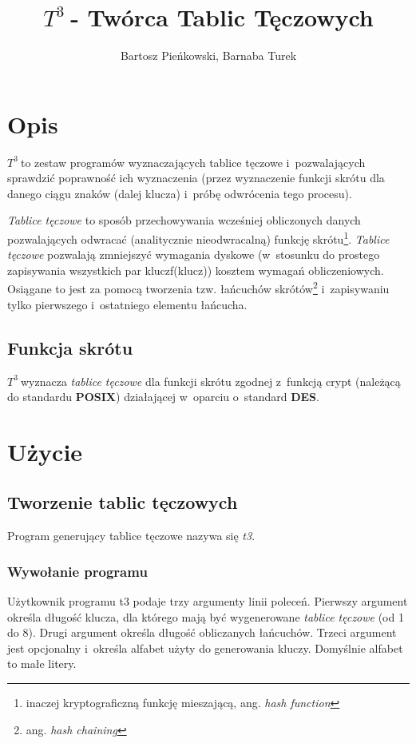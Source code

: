 \documentclass{article}
\begin{document}
\sloppy

\newcommand{\ttt}{$T^3\:$}

\title{\ttt - Twórca Tablic Tęczowych}
\author{Bartosz Pieńkowski, Barnaba Turek}
\maketitle
\section{Opis}
\ttt to zestaw programów wyznaczających tablice tęczowe i~pozwalających sprawdzić poprawność ich wyznaczenia (przez wyznaczenie funkcji skrótu dla danego ciągu znaków (dalej klucza) i~próbę odwrócenia tego procesu).

\emph{Tablice tęczowe} to sposób przechowywania wcześniej obliczonych danych pozwalających odwracać (analitycznie nieodwracalną) funkcję skrótu\footnote{inaczej kryptograficzną funkcję mieszającą, ang. \emph{hash function}}.
\emph{Tablice tęczowe} pozwalają zmniejszyć wymagania dyskowe (w~stosunku do prostego zapisywania wszystkich par klucz\dywiz f(klucz)) kosztem wymagań obliczeniowych.
Osiągane to jest za pomocą tworzenia tzw. łańcuchów skrótów\footnote{ang. \emph{hash chaining}} i~zapisywaniu tylko pierwszego i~ostatniego elementu łańcucha.

\subsection{Funkcja skrótu}
\ttt wyznacza \emph{tablice tęczowe} dla funkcji skrótu zgodnej z~funkcją crypt (należącą do standardu \textbf{POSIX}) działającej w~oparciu o~standard \textbf{DES}.

\section{Użycie}
\subsection{Tworzenie tablic tęczowych}
Program generujący tablice tęczowe nazywa się \emph{t3}.

\subsubsection{Wywołanie programu}
Użytkownik programu t3 podaje trzy argumenty linii poleceń. Pierwszy argument określa długość klucza, dla którego mają być wygenerowane \emph{tablice tęczowe} (od 1 do 8).
Drugi argument określa długość obliczanych łańcuchów.
Trzeci argument jest opcjonalny i~określa alfabet użyty do generowania kluczy. Domyślnie alfabet to małe litery.
\end{document}
